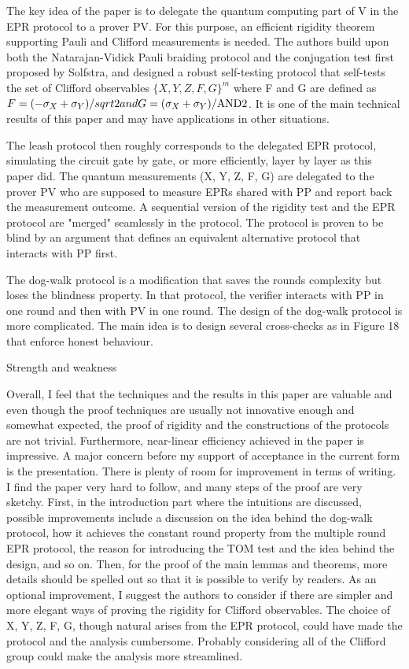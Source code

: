 \documentclass[12pt]{article}
\newcommand{\AND}{\mbox{\rm AND}}
\begin{document}
The key idea of the paper is to delegate the quantum computing part of V in the EPR protocol to a prover PV. For this purpose, an efficient rigidity theorem supporting Pauli and Clifford measurements is needed. The authors build upon both the Natarajan-Vidick Pauli braiding protocol and the conjugation test first proposed by Solfstra, and designed a robust self-testing protocol that self-tests the set of Clifford observables $\{X,Y,Z,F,G\}^m$ where F and G are defined as $F = (-\sigma_X+\sigma_Y)/sqrt{2} and G = (\sigma_X + \sigma_Y)/\AND{2}$. It is one of the main technical results of this paper and may have applications in other situations.

The leash protocol then roughly corresponds to the delegated EPR protocol, simulating the circuit gate by gate, or more efficiently, layer by layer as this paper did. The quantum measurements (X, Y, Z, F, G) are delegated to the prover PV who are supposed to measure EPRs shared with PP and report back the measurement outcome. A sequential version of the rigidity test and the EPR protocol are "merged" seamlessly in the protocol. The protocol is proven to be blind by an argument that defines an equivalent alternative protocol that interacts with PP first.

The dog-walk protocol is a modification that saves the rounds complexity but loses the blindness property. In that protocol, the verifier interacts with PP in one round and then with PV in one round. The design of the dog-walk protocol is more complicated. The main idea is to design several cross-checks as in Figure 18 that enforce honest behaviour.

Strength and weakness


Overall, I feel that the techniques and the results in this paper are valuable and even though the proof techniques are usually not innovative enough and somewhat expected, the proof of rigidity and the constructions of the protocols are not trivial. Furthermore, near-linear efficiency achieved in the paper is impressive. 
A major concern before my support of acceptance in the current form is the presentation. There is plenty of room for improvement in terms of writing. I find the paper very hard to follow, and many steps of the proof are very sketchy. First, in the introduction part where the intuitions are discussed, possible improvements include a discussion on the idea behind the dog-walk protocol, how it achieves the constant round property from the multiple round EPR protocol, the reason for introducing the TOM test and the idea behind the design, and so on. Then, for the proof of the main lemmas and theorems, more details should be spelled out so that it is possible to verify by readers. As an optional improvement, I suggest the authors to consider if there are simpler and more elegant ways of proving the rigidity for Clifford observables. The choice of {X, Y, Z, F, G}, though natural arises from the EPR protocol, could have made the protocol and the analysis cumbersome. Probably considering all of the Clifford group could make the analysis more streamlined.
\end{document}
